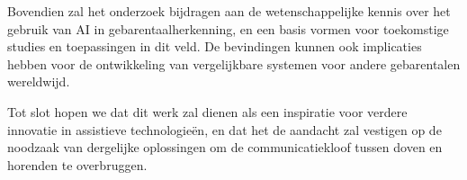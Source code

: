 Bovendien zal het onderzoek bijdragen aan de wetenschappelijke kennis over het gebruik van AI in gebarentaalherkenning, en een basis vormen voor toekomstige studies en toepassingen in dit veld. De bevindingen kunnen ook implicaties hebben voor de ontwikkeling van vergelijkbare systemen voor andere gebarentalen wereldwijd.

Tot slot hopen we dat dit werk zal dienen als een inspiratie voor verdere innovatie in assistieve technologieën, en dat het de aandacht zal vestigen op de noodzaak van dergelijke oplossingen om de communicatiekloof tussen doven en horenden te overbruggen.